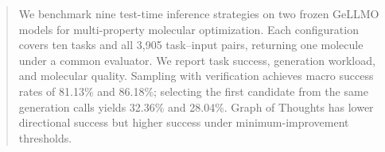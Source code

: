 \begin{abstract}
We benchmark nine test-time inference strategies on two frozen GeLLMO models for multi-property molecular optimization. Each configuration covers ten tasks and all 3,905 task--input pairs, returning one molecule under a common evaluator. We report task success, generation workload, and molecular quality. Sampling with verification achieves macro success rates of 81.13\% and 86.18\%; selecting the first candidate from the same generation calls yields 32.36\% and 28.04\%. Graph of Thoughts has lower directional success but higher success under minimum-improvement thresholds.
\end{abstract}
